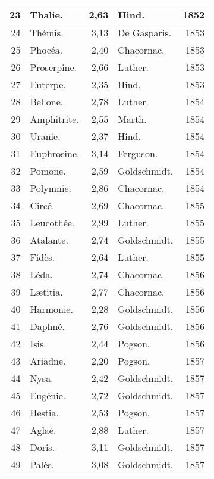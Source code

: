 \documentclass[a4paper, 11pt, oneside]{article}
\begin{document}
\begin{center}
\begin{longtable}{|r|l|r|l|r|}
        23 & Thalie. & 2,63 & Hind. & 1852 \\ \hline
        24 & Thémis. & 3,13 & De Gasparis. & 1853 \\ \hline
        25 & Phocéa. & 2,40 & Chacornac. & 1853 \\ \hline
        26 & Proserpine. & 2,66 & Luther. & 1853 \\ \hline
        27 & Euterpe. & 2,35 & Hind. & 1853 \\ \hline
        28 & Bellone. & 2,78 & Luther. & 1854 \\ \hline
        29 & Amphitrite. & 2,55 & Marth. & 1854 \\ \hline
        30 & Uranie. & 2,37 & Hind. & 1854 \\ \hline
        31 & Euphrosine. & 3,14 & Ferguson. & 1854 \\ \hline
        32 & Pomone. & 2,59 & Goldschmidt. & 1854 \\ \hline
        33 & Polymnie. & 2,86 & Chacornac. & 1854 \\ \hline
        34 & Circé. & 2,69 & Chacornac. & 1855 \\ \hline
        35 & Leucothée. & 2,99 & Luther. & 1855 \\ \hline
        36 & Atalante. & 2,74 & Goldschmidt. & 1855 \\ \hline
        37 & Fidès. & 2,64 & Luther. & 1855 \\ \hline
        38 & Léda. & 2,74 & Chacornac. & 1856 \\ \hline
        39 & Lætitia. & 2,77 & Chacornac. & 1856 \\ \hline
        40 & Harmonie. & 2,28 & Goldschmidt. & 1856 \\ \hline
        41 & Daphné. & 2,76 & Goldschmidt. & 1856 \\ \hline
        42 & Isis. & 2,44 & Pogson. & 1856 \\ \hline
        43 & Ariadne. & 2,20 & Pogson. & 1857 \\ \hline
        44 & Nysa. & 2,42 & Goldschmidt. & 1857 \\ \hline
        45 & Eugénie. & 2,72 & Goldschmidt. & 1857 \\ \hline
        46 & Hestia. & 2,53 & Pogson. & 1857 \\ \hline
        47 & Aglaé. & 2,88 & Luther. & 1857 \\ \hline
        48 & Doris. & 3,11 & Goldschmidt. & 1857 \\ \hline
        49 & Palès. & 3,08 & Goldschmidt. & 1857 \\ \hline

\end{longtable}
\end{center}
\end{document}
